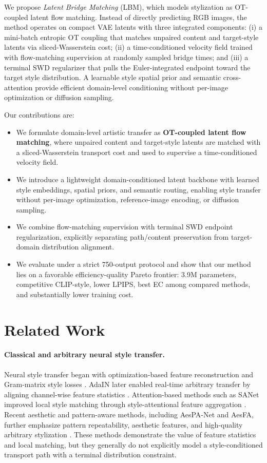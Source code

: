 ﻿\documentclass[letterpaper]{article}
\begin{document}
We propose \emph{Latent Bridge Matching} (LBM), which models stylization as OT-coupled latent flow matching. Instead of directly predicting RGB images, the method operates on compact VAE latents with three integrated components: (i) a mini-batch entropic OT coupling that matches unpaired content and target-style latents via sliced-Wasserstein cost; (ii) a time-conditioned velocity field trained with flow-matching supervision at randomly sampled bridge times; and (iii) a terminal SWD regularizer that pulls the Euler-integrated endpoint toward the target style distribution. A learnable style spatial prior and semantic cross-attention provide efficient domain-level conditioning without per-image optimization or diffusion sampling.

Our contributions are:
\begin{itemize}
    \item We formulate domain-level artistic transfer as \textbf{OT-coupled latent flow matching}, where unpaired content and target-style latents are matched with a sliced-Wasserstein transport cost and used to supervise a time-conditioned velocity field.
    \item We introduce a lightweight domain-conditioned latent backbone with learned style embeddings, spatial priors, and semantic routing, enabling style transfer without per-image optimization, reference-image encoding, or diffusion sampling.
    \item We combine flow-matching supervision with terminal SWD endpoint regularization, explicitly separating path/content preservation from target-domain distribution alignment.
    \item We evaluate under a strict 750-output protocol and show that our method lies on a favorable efficiency-quality Pareto frontier: 3.9M parameters, competitive CLIP-style, lower LPIPS, best EC among compared methods, and substantially lower training cost.
\end{itemize}

\section{Related Work}
\paragraph{Classical and arbitrary neural style transfer.}
Neural style transfer began with optimization-based feature reconstruction and Gram-matrix style losses \cite{gatys2016image}. AdaIN later enabled real-time arbitrary transfer by aligning channel-wise feature statistics \cite{huang2017adain}. Attention-based methods such as SANet improved local style matching through style-attentional feature aggregation \cite{park2019sanet}. Recent aesthetic and pattern-aware methods, including AesPA-Net and AesFA, further emphasize pattern repeatability, aesthetic features, and high-quality arbitrary stylization \cite{hong2023aespa,huang2024aesfa}. These methods demonstrate the value of feature statistics and local matching, but they generally do not explicitly model a style-conditioned transport path with a terminal distribution constraint.
\end{document}

